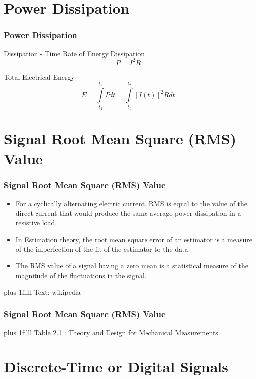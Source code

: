 \documentclass[fleqn]{beamer} %
\newcommand{\sectiontitleII}{Power Dissipation}
\newcommand{\sectiontitleIII}{Signal Root Mean Square (RMS) Value}
\newcommand{\sectiontitleIV}{Discrete-Time or Digital Signals}
\newcommand{\btVFill}{\vskip0pt plus 1filll}
\begin{document}
\section{\sectiontitleII}	
	\begin{frame}[label=sectionII] \small
		\frametitle{\sectiontitleII}
Dissipation - Time Rate of Energy Dissipation    \[ P=I^2R \]  
	
	Total Electrical Energy \hspace{5mm} \[ E =\int\limits_{t_1}^{t_2}P dt=\int\limits_{t_1}^{t_2}[I(t)]^2R dt \]
		
		
	\end{frame}

	
\section{\sectiontitleIII}	

\begin{frame}[label=sectionIII] \small
\frametitle{\sectiontitleIII}
\bigskip

	\begin{itemize}
	\item For a cyclically alternating electric current, RMS is equal to the value of the direct current that would produce the same average power dissipation in a resistive load.
	\item In Estimation theory, the root mean square error of an estimator is a measure of the imperfection of the fit of the estimator to the data.  
	\item The RMS value of a signal having a zero mean is a statistical measure of the magnitude of the fluctuations in the signal.
	\end{itemize}

\btVFill
\tiny{Text: \href{https://en.wikipedia.org/wiki/Root_mean_square\#In_electrical_engineering}{wikipedia}}		

\end{frame}

\begin{frame}[label=sectionIII] \small
\frametitle{\sectiontitleIII}
\bigskip


\btVFill
\tiny{Table 2.1 : Theory and Design for Mechanical Measurements}	
\end{frame}

\section{\sectiontitleIV}	
\end{document}
